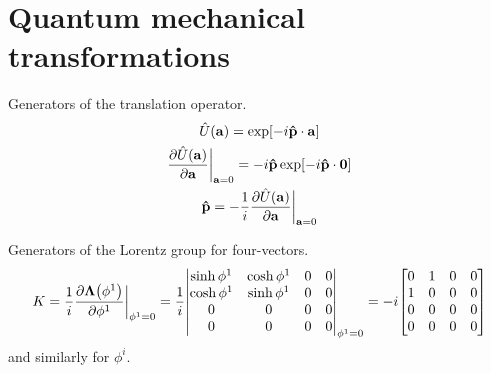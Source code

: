 \documentclass{report}
\begin{document}
\chapter{Quantum mechanical transformations}

\begin{subquests}
	\item Generators of the translation operator.
	\begin{gather*}
		\hat{U}\pqty{\vb a} = \exp[-i{\vb{\hat p} \cdot \vb a}] \\
		\pdv{\hat{U}\pqty{\vb a}}{\vb a}\bigg|_{{\vb a} = 0} = -i{\vb{\hat p}}\exp[-i{\vb{\hat{p}}\cdot \vb 0}]\\
		\vb{\hat{p}} = -\frac{1}{i}\pdv{\hat{U}\pqty{\vb a}}{\vb a}\bigg|_{{\vb a} = 0}
	\end{gather*}

	\item Generators of the Lorentz group for four-vectors.
	\begin{gather*}
		K = \frac{1}{i}\pdv{{\vb \Lambda}\pqty{\phi^1}}{\phi^1}\bigg|_{{\phi^1} = 0} = \frac{1}{i}\mqty|
			\sinh \phi^1 & \cosh \phi^1 & 0 & 0 \\
			\cosh \phi^1 & \sinh \phi^1 & 0 & 0 \\
			0 & 0 & 0 & 0 \\
			0 & 0 & 0 & 0
		|_{\phi^1 = 0}
		= -i\mqty[
			0 & 1 & 0 & 0 \\
			1 & 0 & 0 & 0 \\
			0 & 0 & 0 & 0 \\
			0 & 0 & 0 & 0
		]
	\end{gather*}
	and similarly for $\phi^i$.


\end{subquests}
\end{document}
